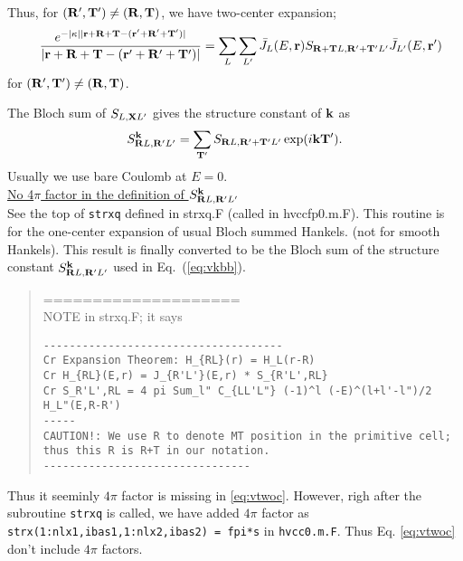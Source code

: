 \documentclass[a4paper,10pt,fleqn]{article}
\newcommand{\bfk}{{\bf k}}
\newcommand{\bfr}{{\bf r}}
\newcommand{\bfX}{{\bf X}}
\newcommand{\bfT}{{\bf T}}
\newcommand{\bfR}{{\bf R}}
\newcommand{\req}[1]{\mbox{Eq.~(\ref{#1})}}
\begin{document}
Thus, for $(\bfR',\bfT')\neq(\bfR,\bfT)$, 
we have two-center expansion;
\begin{eqnarray}
&&
\frac{e^{-|\kappa||\bfr+\bfR+\bfT-(\bfr'+\bfR'+\bfT')|}}
{|\bfr+\bfR+\bfT-(\bfr'+\bfR'+\bfT')|}
= \sum_L \sum_{L'}
{\bar{J}_L(E,\bfr)}
S_{\bfR+\bfT{L},\bfR'+\bfT'{L'}} {\bar{J}_{L'}(E,\bfr')} 
\label{eq:vtwoc}
\end{eqnarray}
for $(\bfR',\bfT')\neq(\bfR,\bfT)$. 

The Bloch sum of $S_{{L},\bfX{L'}}$
gives the structure constant of $\bfk$ as
\begin{eqnarray}
S^\bfk_{\bfR{L},\bfR'{L'}}=
\sum_{\bfT'} S_{\bfR{L},\bfR'+\bfT'{L'}}\exp(i \bfk \bfT').
\label{eq:fftstrx}
\end{eqnarray}
Usually we use bare Coulomb at $E=0$.\\

\noindent \underline{ No 4$\pi$ factor in the definition of $S^{\bfk}_{\bfR{L},\bfR'{L'}}$}\\
See the top of \verb#strxq# defined in strxq.F (called in hvccfp0.m.F). 
This routine is for the one-center expansion of 
usual Bloch summed Hankels. (not for smooth Hankels).
This result is finally converted to be the 
Bloch sum of the structure constant 
$S^{\bfk}_{\bfR{L},\bfR'{L'}}$ used in \req{eq:vkbb}.
\begin{quote}
====================\\
NOTE in strxq.F; it says
\begin{verbatim}
-------------------------------------
Cr Expansion Theorem: H_{RL}(r) = H_L(r-R)
Cr H_{RL}(E,r) = J_{R'L'}(E,r) * S_{R'L',RL}
Cr S_R'L',RL = 4 pi Sum_l" C_{LL'L"} (-1)^l (-E)^(l+l'-l")/2 H_L"(E,R-R')
-----
CAUTION!: We use R to denote MT position in the primitive cell; 
thus this R is R+T in our notation.
--------------------------------
\end{verbatim}
\end{quote}
Thus it seeminly $4 \pi$ factor is missing in \ref{eq:vtwoc}.
However, righ after the subroutine \verb#strxq# is called, we have added
$4\pi$ factor as \verb#strx(1:nlx1,ibas1,1:nlx2,ibas2) = fpi*s# in
\verb#hvcc0.m.F#. Thus Eq. \ref{eq:vtwoc}
don't include $4\pi$ factors.
\end{document}
